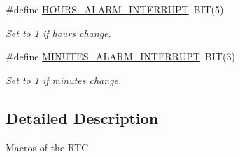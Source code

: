 \begin{DoxyCompactItemize}
\#define \hyperlink{group___r_t_c___macros_ga8608b390793bacadc72dc418766b928b}{H\+O\+U\+R\+S\+\_\+\+A\+L\+A\+R\+M\+\_\+\+I\+N\+T\+E\+R\+R\+U\+PT}~B\+IT(5)
\begin{DoxyCompactList}\small\item\em Set to 1 if hours change. \end{DoxyCompactList}\item 
\mbox{\label{group___r_t_c___macros_ga449a7797d3734eae1b1e9099f02b3e85}} 
\#define \hyperlink{group___r_t_c___macros_ga449a7797d3734eae1b1e9099f02b3e85}{M\+I\+N\+U\+T\+E\+S\+\_\+\+A\+L\+A\+R\+M\+\_\+\+I\+N\+T\+E\+R\+R\+U\+PT}~B\+IT(3)
\begin{DoxyCompactList}\small\item\em Set to 1 if minutes change. \end{DoxyCompactList}\end{DoxyCompactItemize}


\subsection{Detailed Description}
Macros of the R\+TC 